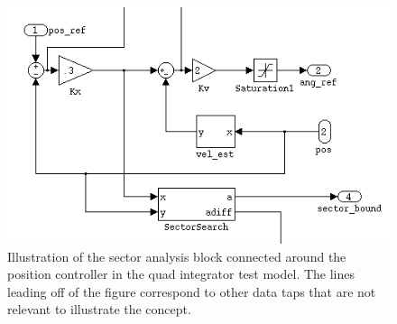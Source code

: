 \begin{figure}[htb]
\centering
\includegraphics[width=\columnwidth]{figures/sectorconn}
    \caption{Illustration of the sector analysis block connected around the position
controller in the quad integrator test model.  The lines leading off of the figure
correspond to other data taps that are not relevant to illustrate the concept.}
    \label{fig:sectorconn}
\end{figure}

